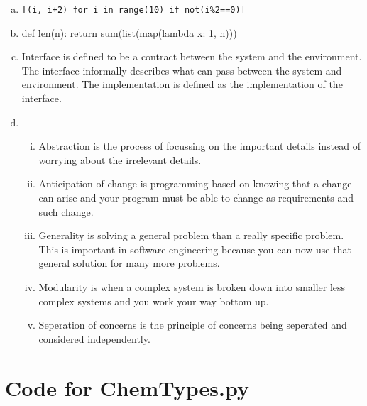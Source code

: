 \documentclass[12pt]{article}
\begin{document}
\begin{enumerate}[a)]
\item \texttt{[(i, i+2) for i in range(10) if not(i\%2==0)]}

\item def len(n): return sum(list(map(lambda x: 1, n)))

\item Interface is defined to be a contract between the system and the environment. The interface informally describes what can pass between the system and environment. The implementation is defined as the implementation of the interface.

\item
\begin{enumerate}[i)]

\item Abstraction is the process of focussing on the important details instead of worrying about the irrelevant details.

\item Anticipation of change is programming based on knowing that a change can arise and your program must be able to change as requirements and such change.

\item Generality is solving a general problem than a really specific problem. This is important in software engineering because you can now use that general solution for many more problems.

\item Modularity is when a complex system is broken down into smaller less complex systems and you work your way bottom up.

\item Seperation of concerns is the principle of concerns being seperated and considered independently.

\end{enumerate}

\end{enumerate}

\newpage

\lstset{language=Python, basicstyle=\tiny, breaklines=true, showspaces=false,
  showstringspaces=false, breakatwhitespace=true}

\def\thesection{\Alph{section}}

\section{Code for ChemTypes.py}
\end{document}
